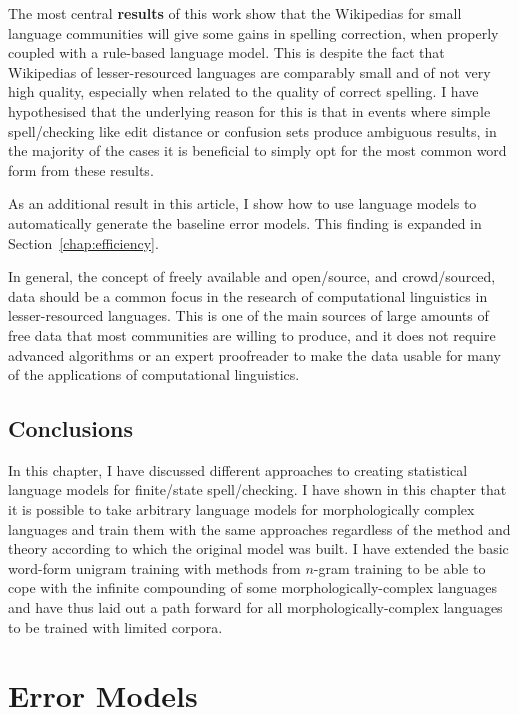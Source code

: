\documentclass[officiallayout,final]{unihelcompling}
\begin{document}
The most central \textbf{results} of this work show that the Wikipedias for
small language communities will give some gains in spelling correction, when
properly coupled with a rule-based language model. This is despite the fact
that Wikipedias of lesser-resourced languages are comparably small and of not
very high quality, especially when related to the quality of correct spelling.
I have hypothesised that the underlying reason for this is that in events where
simple spell\-/checking like edit distance or confusion sets produce ambiguous
results, in the majority of the cases it is beneficial to simply opt for the
most common word form from these results.

As an additional result in this article, I show how to use language models to
automatically generate the baseline error models. This finding is expanded in
Section~\ref{chap:efficiency}.

In general, the concept of freely available and open\-/source, and
crowd\-/sourced, data should be a common focus in the research of computational
linguistics in lesser-resourced languages. This is one of the main sources of
large amounts of free data that most communities are willing to produce, and it
does not require advanced algorithms or an expert proofreader to make the data
usable for many of the applications of computational linguistics.

\section{Conclusions}

In this chapter, I have discussed different approaches to creating
statistical language models for finite\-/state spell\-/checking. I have
shown in this chapter that it is possible to take arbitrary language models for
morphologically complex languages and train them with the same approaches
regardless of the method and theory according to which the original model was
built. I have extended the basic word-form unigram training with methods from
\(n\)-gram training to be able to cope with the infinite compounding of some
morphologically-complex languages and have thus laid out a path forward for all
morphologically-complex languages to be trained with limited corpora.


\chapter{Error Models}
\label{chap:error-models}
\end{document}

